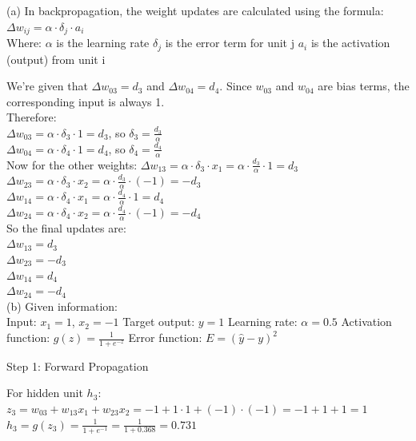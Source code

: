 \solution

(a) In backpropagation, the weight updates are calculated using the formula:\\
$\Delta w_{ij} = \alpha \cdot \delta_j \cdot a_i$\\

Where:
 $\alpha$ is the learning rate
 $\delta_j$ is the error term for unit j
 $a_i$ is the activation (output) from unit i

We're given that $\Delta w_{03} = d_3$ and $\Delta w_{04} = d_4$. Since $w_{03}$ and $w_{04}$ are bias terms, the corresponding input is always 1.\\

Therefore:\\
 $\Delta w_{03} = \alpha \cdot \delta_3 \cdot 1 = d_3$, so $\delta_3 = \frac{d_3}{\alpha}$\\
 $\Delta w_{04} = \alpha \cdot \delta_4 \cdot 1 = d_4$, so $\delta_4 = \frac{d_4}{\alpha}$\\

Now for the other weights:
 $\Delta w_{13} = \alpha \cdot \delta_3 \cdot x_1 = \alpha \cdot \frac{d_3}{\alpha} \cdot 1 = d_3$\\
 $\Delta w_{23} = \alpha \cdot \delta_3 \cdot x_2 = \alpha \cdot \frac{d_3}{\alpha} \cdot (-1) = -d_3$\\
 $\Delta w_{14} = \alpha \cdot \delta_4 \cdot x_1 = \alpha \cdot \frac{d_4}{\alpha} \cdot 1 = d_4$\\
 $\Delta w_{24} = \alpha \cdot \delta_4 \cdot x_2 = \alpha \cdot \frac{d_4}{\alpha} \cdot (-1) = -d_4$\\

So the final updates are:\\
 $\Delta w_{13} = d_3$\\
 $\Delta w_{23} = -d_3$\\
 $\Delta w_{14} = d_4$\\
 $\Delta w_{24} = -d_4$\\

(b) Given information:\\
 Input: $x_1 = 1$, $x_2 = -1$
 Target output: $y = 1$
 Learning rate: $\alpha = 0.5$
 Activation function: $g(z) = \frac{1}{1+e^{-z}}$
 Error function: $E = (\hat{y}-y)^2$

Step 1: Forward Propagation

For hidden unit $h_3$:\\
$z_3 = w_{03} + w_{13}x_1 + w_{23}x_2 = -1 + 1 \cdot 1 + (-1) \cdot (-1) = -1 + 1 + 1 = 1$\\
$h_3 = g(z_3) = \frac{1}{1+e^{-1}} = \frac{1}{1+0.368} = 0.731$\\


